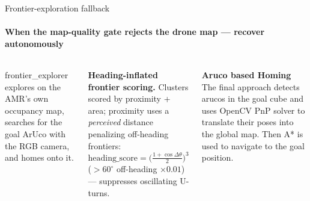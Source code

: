 \documentclass[aspectratio=169,11pt]{beamer}
\newcommand{\subsys}[1]{{\small\ttfamily #1}}
\begin{document}
\begin{frame}{Frontier-exploration fallback}
\framesubtitle{When the map-quality gate rejects the drone map --- recover autonomously}
\begin{columns}[T]
\footnotesize
\subsys{frontier\_explorer} explores on the AMR's own occupancy map, searches for
the goal ArUco with the RGB camera, and homes onto it.
\vspace{0.2em}

\centering
{}
\footnotesize
\textbf{Heading-inflated frontier scoring.} Clusters scored by proximity + area;
proximity uses a \emph{perceived} distance penalizing off-heading frontiers:
\[ \text{heading\_score}=\Big(\tfrac{1+\cos\Delta\theta}{2}\Big)^3 \]
($>60^\circ$ off-heading $\times0.01$) --- suppresses oscillating U-turns.
\vspace{0.3em}

\textbf{Aruco based Homing} The final approach detects arucos in the goal cube and uses OpenCV PnP solver to translate their poses into the global map.
Then A* is used to navigate to the goal position. 
\end{columns}
\end{frame}
\end{document}
